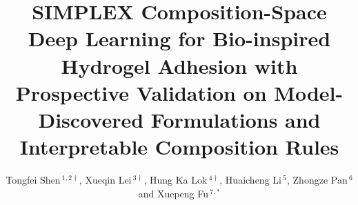 \documentclass[utf8]{FrontiersinHarvard}
\def\firstAuthorLast{Shen, Lei, Hung, Li, Pan and Fu {et~al.}}
\def\Authors{Tongfei Shen\,$^{1,2\dagger}$, Xueqin Lei\,$^{3\dagger}$, Hung Ka Lok\,$^{4\dagger}$, Huaicheng Li\,$^{5}$, Zhongze Pan\,$^{6}$ and Xuepeng Fu\,$^{7,*}$}
\begin{document}
\onecolumn
{}

\title[SIMPLEX composition-space deep learning for hydrogel adhesion screening]{SIMPLEX Composition-Space Deep Learning for Bio-inspired Hydrogel Adhesion with Prospective Validation on Model-Discovered Formulations and Interpretable Composition Rules}

\author[\firstAuthorLast ]{\Authors}
\address{}
\correspondance{}
\extraAuth{}
\maketitle

\begin{abstract}
\section{}

\end{abstract}
\end{document}
